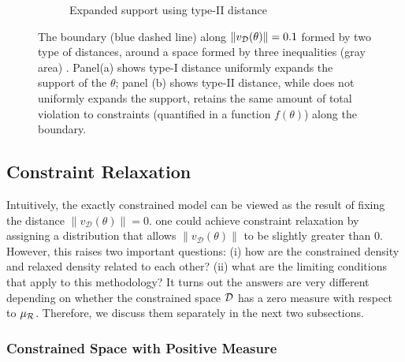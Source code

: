 \documentclass[10pt,fleqn]{article}
\DeclareMathOperator{\1}{\mathbbm{1}} \DeclareMathOperator{\bigO}{\mc O}
\begin{document}
\begin{figure}[H]
\begin{subfigure}[b]{0.45\textwidth}
{}
        \caption{Expanded support using type-II distance}
    \end{subfigure}

 \caption{ The boundary (blue dashed line) along $\|v_{\mathcal{D}}(\theta)\| = 0.1$  formed by two type of distances, around a space formed by three inequalities (gray area) \label{fig:two_distances}. Panel(a) shows type-I distance uniformly expands
the support of the $\theta$; panel (b) shows type-II distance, while does
not uniformly expands the support, retains the same amount of total violation
 to constraints (quantified in a function $f(\theta)$) along the boundary.}
\end{figure}




\subsection{Constraint Relaxation}
Intuitively, the exactly constrained model can be viewed as the result of fixing the distance $\|v_\mathcal{D}(\theta)\| = 0$.  one could achieve constraint relaxation by assigning
a distribution that allows $\|v_\mathcal{D}(\theta)\|$ to be slightly greater than $0$. However, this raises two important questions:
(i) how are the  constrained density and
relaxed density related to each other? (ii) what are
the limiting conditions that apply to this methodology?
It turns out the answers are very different depending
on whether the constrained space $\mathcal{D}$ has a zero
measure with respect to $\mu_{\mathcal{R}}$. Therefore, we
discuss them separately in the next two subsections.

\subsubsection{Constrained Space with Positive Measure}
\end{document}
